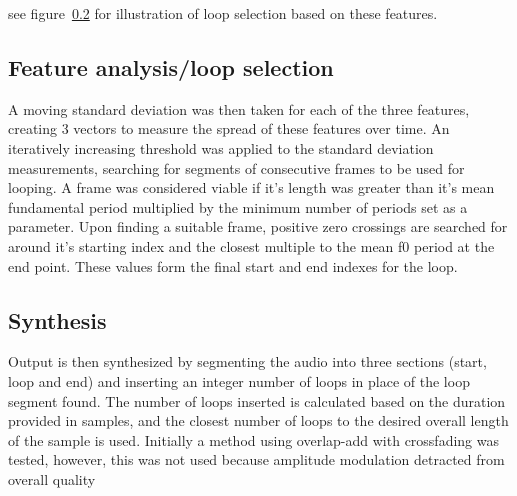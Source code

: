 \documentclass[titlepage]{scrartcl}
\begin{document}
see figure~\ref{} for illustration of loop
selection based on these features.
\subsection{Feature analysis/loop selection}
A moving standard deviation was then taken for each of the three features,
creating 3 vectors to measure the spread of these features over time.
An iteratively increasing threshold was applied to the standard deviation
measurements, searching for segments of consecutive frames to be used for
looping. A frame was considered viable if it's length was greater than it's
mean fundamental period multiplied by the minimum number of periods set as a
parameter. 
Upon finding a suitable frame, positive zero crossings are searched for around
it's starting index and the closest multiple to the mean f0 period at the end
point. These values form the final start and end indexes for the loop.

\subsection{Synthesis}
Output is then synthesized by segmenting the audio into three sections (start,
loop and end) and inserting an integer number of loops in place of
the loop segment found. The number of loops inserted is calculated based on the
duration provided in samples, and the closest number of loops to the desired
overall length of the sample is used.
Initially a method using overlap-add with crossfading was tested, however, this
was not used because amplitude modulation detracted from overall quality
\end{document}
